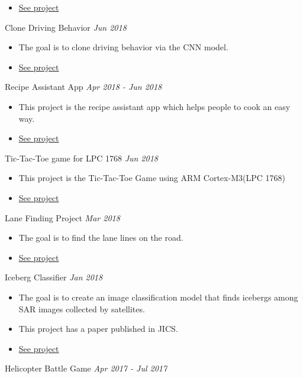 \documentclass[10pt]{article}
\newenvironment{changemargin}[2]{
  \begin{list}{}{
    \setlength{\topsep}{0pt}
    \setlength{\leftmargin}{#1}
    \setlength{\rightmargin}{#2}
    \setlength{\listparindent}{\parindent}
    \setlength{\itemindent}{\parindent}
    \setlength{\parsep}{\parskip}
  }
  \item[]}{\end{list}
}
\newcommand{\project}[2]{
	{#1} \hfill \emph{#2}\\ \medskip
}
\newenvironment{body} {
	\vspace*{-16pt}
	\begin{changemargin}{-0.25in}{-0.5in}
  }
	{\end{changemargin}
}
\begin{document}
\begin{body}
\begin{itemize}
      \item \href{https://github.com/jeongwhanchoi/CarND-Vehicle-Detection}{See project}
  	\end{itemize}
\project{Clone Driving  Behavior}{Jun 2018}
\begin{itemize} \itemsep -0pt  %
      \item  The goal is to clone driving behavior via the CNN model.
      \item \href{https://github.com/jeongwhanchoi/CarND-Behavioral-Cloning}{See project}
  	\end{itemize}
\project{Recipe Assistant App}{Apr 2018 - Jun 2018}
\begin{itemize} \itemsep -0pt  %
      \item  This project is the recipe assistant app which helps people to cook an easy way.
      \item \href{https://github.com/jeongwhanchoi/recipe-assistant-app}{See project}
  	\end{itemize}
\project{Tic-Tac-Toe game for LPC 1768}{Jun 2018}
\begin{itemize} \itemsep -0pt  %
      \item  This project is the Tic-Tac-Toe Game using ARM Cortex-M3(LPC 1768)
      \item \href{https://github.com/jeongwhanchoi/tic-tac-toe-lpc1768}{See project}
  	\end{itemize}
\project{Lane Finding Project}{Mar 2018}
\begin{itemize} \itemsep -0pt  %
      \item  The goal is to find the lane lines on the road.
      \item \href{https://github.com/jeongwhanchoi/CarND-LaneLines}{See project}
  	\end{itemize}
\project{Iceberg Classifier}{Jan 2018}
\begin{itemize} \itemsep -0pt  %
      \item  The goal is to create an image classification model that finds icebergs among SAR images collected by satellites.
      \item This project has a paper published in JICS.
      \item \href{https://github.com/jeongwhanchoi/MLND-Capstone-Project}{See project}
  	\end{itemize}
\project{Helicopter Battle Game}{Apr 2017 - Jul 2017}

\end{body}
\end{document}
